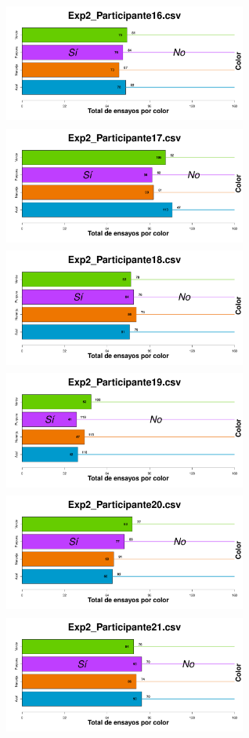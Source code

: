 \documentclass[a4paper ]{article}
\begin{document}
\begin{figure}[th]
\begin{center}
\includegraphics[width=8cm, height=4cm]{Figures/BiasColor_Exp2_P16} \includegraphics[width=8cm, height=4cm]{Figures/BiasColor_Exp2_P17} \includegraphics[width=8cm, height=4cm]{Figures/BiasColor_Exp2_P18}
\includegraphics[width=8cm, height=4cm]{Figures/BiasColor_Exp2_P19} \includegraphics[width=8cm, height=4cm]{Figures/BiasColor_Exp2_P20} \includegraphics[width=8cm, height=4cm]{Figures/BiasColor_Exp2_P21}
\end{center}
\end{figure}
\end{document}

